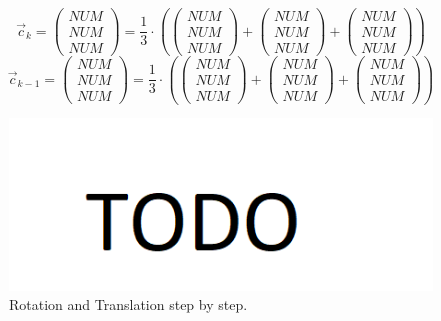 \begin{equation*}
    \vec{c}_{k}=
    \begin{pmatrix}
        NUM \\
        NUM \\
        NUM
    \end{pmatrix}
    =\frac{1}{3}\cdot\left(
    \begin{pmatrix}
        NUM \\
        NUM \\
        NUM
    \end{pmatrix}
    +
    \begin{pmatrix}
        NUM \\
        NUM \\
        NUM
    \end{pmatrix}
    +
    \begin{pmatrix}
        NUM \\
        NUM \\
        NUM
    \end{pmatrix}
    \right)
\end{equation*}
\begin{equation*}
    \vec{c}_{k-1}=
    \begin{pmatrix}
        NUM \\
        NUM \\
        NUM
    \end{pmatrix}
    =\frac{1}{3}\cdot\left(
    \begin{pmatrix}
        NUM \\
        NUM \\
        NUM
    \end{pmatrix}
    +
    \begin{pmatrix}
        NUM \\
        NUM \\
        NUM
    \end{pmatrix}
    +
    \begin{pmatrix}
        NUM \\
        NUM \\
        NUM
    \end{pmatrix}
    \right)
\end{equation*}
\begin{figure}[H]
    \centering
    \includegraphics[width=1.0\textwidth]{images/todo.png}
    \caption{Rotation and Translation step by step.}
    \label{im:SVD_step_by_step}
\end{figure}
